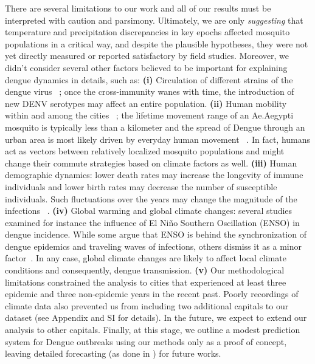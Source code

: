 \documentclass[final,leqno]{siamltexmm2}
\begin{document}
There are several limitations to our work and all of our results must be interpreted with caution 
and parsimony. Ultimately, we are only \textit{suggesting} that temperature and precipitation discrepancies in key epochs affected 
mosquito populations in a critical way, and despite the plausible hypotheses, they were not yet directly measured or reported satisfactory by field studies. Moreover, we didn't consider several other factors believed to be important for explaining 
dengue dynamics in details, such as: \textbf{(i)} Circulation of different strains of the dengue virus ~\cite{Rabaa,Raghwani,Diaz,Adams}; once the cross-immunity wanes with time, the introduction of new DENV serotypes may affect an entire population.  \textbf{(ii)} Human mobility within and among the cities ~\cite{manbites,stoddard,stolerman,Wesolowski,Barmak}; the lifetime movement range of an Ae.Aegypti mosquito is 
typically less than a kilometer and the spread of Dengue through an urban area is most likely driven by everyday human movement
~\cite{Harrington,Medeiros}. In fact, humans act as vectors between relatively localized mosquito populations 
and might change their commute strategies based on climate factors as well. \textbf{(iii)} Human demographic dynamics:
lower death rates may increase the longevity of immune individuals and lower birth rates may decrease the number of susceptible individuals. Such fluctuations over the years may change the magnitude of the infections ~\cite{Cummings,Mondini}.
\textbf{(iv)} Global warming and global climate changes: several studies examined for instance the influence of El Niño Southern Oscillation (ENSO) in dengue incidence. While some argue that ENSO is behind the synchronization of dengue epidemics and traveling waves of infections, others dismiss it as a minor factor~\cite{MAJohansson, Cazelles, Banu,Naish }. In any case, global climate changes are likely to affect local climate conditions and consequently, 
dengue transmission.  
\textbf{(v)} Our methodological limitations constrained the analysis to cities that experienced at least three epidemic and three non-epidemic years in the recent past. Poorly recordings of climate data also prevented us from including two additional capitals to our dataset
(see Appendix and SI for details). In the future, we expect to extend our analysis to other capitals. Finally, at this stage, we outline a modest 
prediction system for Dengue outbreaks using our methods only as a proof of concept, leaving detailed forecasting (as done in \cite{Buczak2012,Buczak2014}) for future works.
\end{document}
